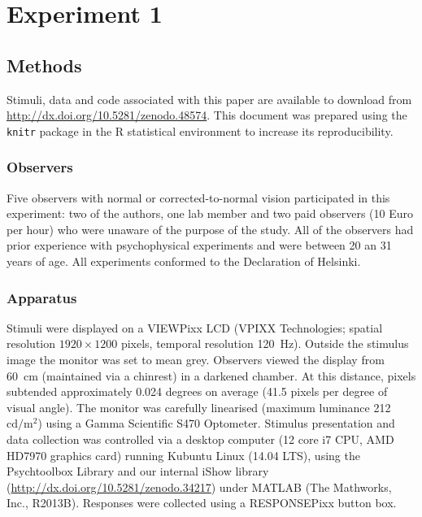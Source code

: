\documentclass[doc, 11pt,a4paper,natbib]{apa6}\usepackage[]{graphicx}\usepackage[]{color}
\begin{document}
\section{Experiment 1}


\subsection{Methods}

Stimuli, data and code associated with this paper are available to download from \url{http://dx.doi.org/10.5281/zenodo.48574}.
This document was prepared using the \texttt{knitr} package \citep{xie_knitr_2013, xie_dynamic_2015} in the R statistical environment \citep{r_core_development_team_r:_2016,wickham_dplyr:_2016,wickham_ggplot2_2009,wickham_splitapplycombine_2011, auguie_gridextra:_2016, arnold_ggthemes:_2016} to increase its reproducibility.

\subsubsection{Observers}

Five observers with normal or corrected-to-normal vision participated in this experiment: two of the authors, one lab member and two paid observers (10 Euro per hour) who were unaware of the purpose of the study. All of the observers had prior experience with psychophysical experiments and were between 20 an 31 years of age.
All experiments conformed to the Declaration of Helsinki.

\subsubsection{Apparatus}

Stimuli were displayed on a VIEWPixx LCD (VPIXX Technologies; spatial resolution $1920 \times 1200$ pixels, temporal resolution 120~Hz).
Outside the stimulus image the monitor was set to mean grey.
Observers viewed the display from 60~cm (maintained via a chinrest) in a darkened chamber.
At this distance, pixels subtended approximately 0.024 degrees on average (41.5 pixels per degree of visual angle).
The monitor was carefully linearised (maximum luminance 212~$\mathrm{cd}/ \mathrm{m}^2$) using a Gamma Scientific S470 Optometer.
Stimulus presentation and data collection was controlled via a desktop computer (12 core i7 CPU, AMD HD7970 graphics card) running Kubuntu Linux (14.04 LTS), using the Psychtoolbox Library \citep[][version 3.0.11]{kleiner_whats_2007,pelli_videotoolbox_1997,brainard_psychophysics_1997} and our internal iShow library (\url{http://dx.doi.org/10.5281/zenodo.34217}) under MATLAB (The Mathworks, Inc., R2013B).
Responses were collected using a RESPONSEPixx button box.
\end{document}
